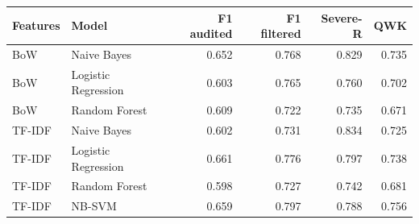 \begin{tabular}{llrrrr}
\toprule
Features & Model & F1 audited & F1 filtered & Severe-R & QWK \\
\midrule
BoW & Naive Bayes & 0.652 & 0.768 & 0.829 & 0.735 \\
BoW & Logistic Regression & 0.603 & 0.765 & 0.760 & 0.702 \\
BoW & Random Forest & 0.609 & 0.722 & 0.735 & 0.671 \\
TF-IDF & Naive Bayes & 0.602 & 0.731 & 0.834 & 0.725 \\
TF-IDF & Logistic Regression & 0.661 & 0.776 & 0.797 & 0.738 \\
TF-IDF & Random Forest & 0.598 & 0.727 & 0.742 & 0.681 \\
TF-IDF & NB-SVM & 0.659 & 0.797 & 0.788 & 0.756 \\
\bottomrule
\end{tabular}%
